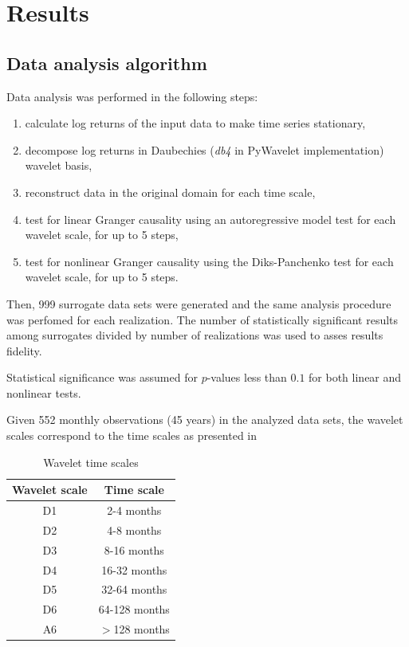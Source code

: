 \section{Results} \label{sec:results}

\subsection{Data analysis algorithm}

Data analysis was performed in the following steps:
\begin{enumerate}
\item calculate log returns of the input data to make time series stationary,
\item decompose log returns in Daubechies (\emph{db4} in PyWavelet implementation) wavelet basis,
\item reconstruct data in the original domain for each time scale,
\item test for linear Granger causality using an autoregressive model test for each wavelet scale, for up to 5 steps,
\item test for nonlinear Granger causality using the Diks-Panchenko test for each wavelet scale, for up to 5 steps.
\end{enumerate}

Then, 999 surrogate data sets were generated and the same analysis procedure was perfomed for each realization.
The number of statistically significant results among surrogates divided by number of realizations was used to asses results fidelity.

Statistical significance was assumed for $p$-values less than $0.1$ for both linear and nonlinear tests.

Given 552 monthly observations (45 years) in the analyzed data sets, the wavelet scales correspond to the time scales as presented in  

\begin{table}[h]
\begin{center}
\begin{tabular}{c|c}
\hline\hline
Wavelet scale & Time scale \\
\hline
D1 & 2-4 months \\
D2 & 4-8 months \\
D3 & 8-16 months \\
D4 & 16-32 months \\
D5 & 32-64 months \\
D6 & 64-128 months \\
A6 & $>$128 months \\
\hline\hline
\end{tabular}
\end{center}
\caption{Wavelet time scales}
\label{tab:scales}
\end{table}

